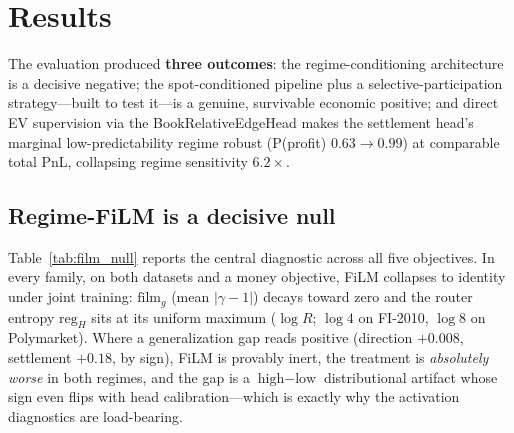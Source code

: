 \documentclass{article}
\begin{document}
\section{Results}\label{sec:results}

The evaluation produced \textbf{three outcomes}: the regime-conditioning
architecture is a decisive negative; the spot-conditioned pipeline plus a
selective-participation strategy---built to test it---is a genuine,
survivable economic positive; and direct EV supervision via the
BookRelativeEdgeHead makes the settlement head's marginal low-predictability
regime robust (P(profit) $0.63\!\to\!0.99$) at comparable total PnL, collapsing
regime sensitivity $6.2{\times}$.

\subsection{Regime-FiLM is a decisive null}\label{sec:results_null}

Table~\ref{tab:film_null} reports the central diagnostic across all five
objectives.  In every family, on both datasets and a money objective,
FiLM collapses to identity under joint training: $\mathrm{film}_g$
(mean $|\gamma - 1|$) decays toward zero and the router entropy
$\mathrm{reg}_H$ sits at its uniform maximum ($\log R$; $\log 4$ on
FI-2010, $\log 8$ on Polymarket).  Where a generalization gap reads
positive (direction $+0.008$, settlement $+0.18$, by sign), FiLM is
provably inert, the treatment is \emph{absolutely worse} in both
regimes, and the gap is a $\text{high}-\text{low}$ distributional
artifact whose sign even flips with head calibration---which is exactly
why the activation diagnostics are load-bearing.
\end{document}
